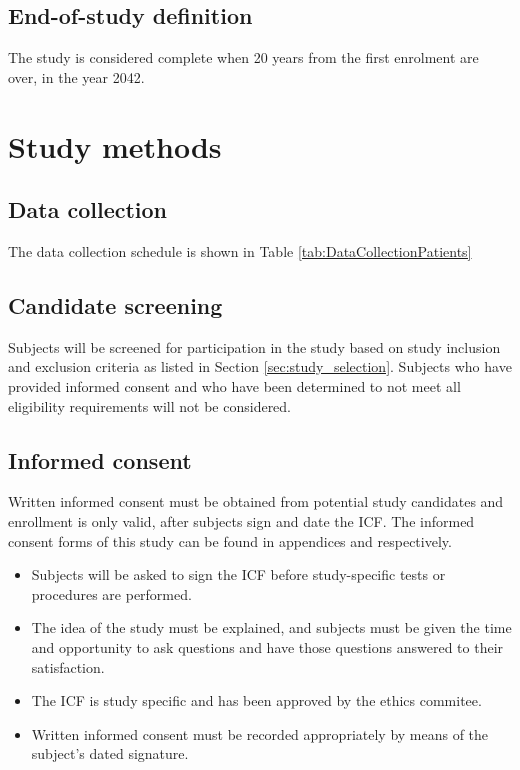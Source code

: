 \subsection{End-of-study definition}
The study is considered complete when 20 years from the first enrolment are over, in the year 2042.

\section{Study methods}
\subsection{Data collection}
The data collection schedule is shown in Table \ref{tab:DataCollectionPatients}


\subsection{Candidate screening}
\label{subsec:screening}
Subjects will be screened for participation in the study based on study inclusion and exclusion criteria as listed in Section \ref{sec:study_selection}. Subjects who have provided informed consent and who have been determined to not meet all eligibility requirements will not be considered.

\subsection{Informed consent}
Written informed consent must be obtained from potential study candidates and enrollment is only valid, after subjects sign and date the \ac{ICF}. The informed consent forms of this study can be found in appendices \label{sec:icf_patient} and \label{sec:icf_relative} respectively.

\begin{itemize}[noitemsep, topsep=0pt]
\item Subjects will be asked to sign the \ac{ICF} before study-specific tests or procedures are performed.
\item The idea of the study must be explained, and subjects must be given the time and opportunity to ask questions and have those questions answered to their satisfaction.
\item The \ac{ICF} is study specific and has been approved by the ethics commitee.
\item Written informed consent must be recorded appropriately by means of the subject’s dated signature.
\end{itemize}

